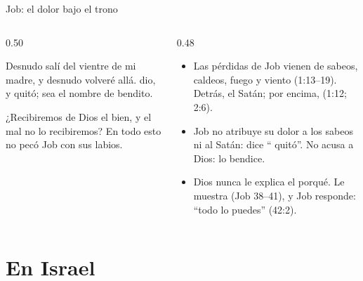 \begin{frame}{Job: el dolor bajo el trono}
\begin{columns}[t,onlytextwidth]
\begin{column}{0.50\textwidth}
\begin{cita}Desnudo salí del vientre de mi madre, y desnudo volveré allá. \SENOR{} dio, y \SENOR{} quitó; sea el nombre de \SENOR{} bendito.\end{cita}
\begin{cita}¿Recibiremos de Dios el bien, y el mal no lo recibiremos? En todo esto no pecó Job con sus labios.\end{cita}
\end{column}
\begin{column}{0.48\textwidth}\small
\begin{itemize}
\item Las pérdidas de Job vienen de sabeos, caldeos, fuego y viento (1:13--19). Detrás, el Satán; por encima,  (1:12; 2:6).
\item Job no atribuye su dolor a los sabeos ni al Satán: dice ``\SENOR{} quitó''. No acusa a Dios: lo bendice.
\item Dios nunca le explica el porqué. Le muestra  (Job 38--41), y Job responde: ``todo lo puedes'' (42:2).
\end{itemize}
\end{column}
\end{columns}
\end{frame}

\section{En Israel}

